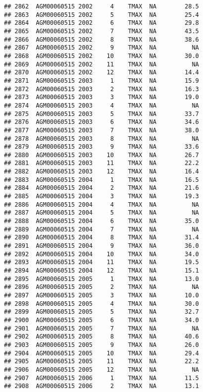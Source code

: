 \documentclass{article}\usepackage[]{graphicx}\usepackage[]{color}
\makeatletter
\newenvironment{kframe}{%
 \def\at@end@of@kframe{}%
 \ifinner\ifhmode%
  \def\at@end@of@kframe{\end{minipage}}%
  \begin{minipage}{\columnwidth}%
 \fi\fi%
 \def\FrameCommand##1{\hskip\@totalleftmargin \hskip-\fboxsep
 \colorbox{shadecolor}{##1}\hskip-\fboxsep
     \hskip-\linewidth \hskip-\@totalleftmargin \hskip\columnwidth}%
 \MakeFramed {\advance\hsize-\width
   \@totalleftmargin\z@ \linewidth\hsize
   \@setminipage}}%
 {\par\unskip\endMakeFramed%
 \at@end@of@kframe}
\newenvironment{knitrout}{}{} %
\makeatother
\begin{document}
\begin{knitrout}
\begin{kframe}
\begin{verbatim}
## 2862  AGM00060515 2002     4    TMAX  NA        28.5
## 2863  AGM00060515 2002     5    TMAX  NA        25.4
## 2864  AGM00060515 2002     6    TMAX  NA        29.8
## 2865  AGM00060515 2002     7    TMAX  NA        43.5
## 2866  AGM00060515 2002     8    TMAX  NA        38.6
## 2867  AGM00060515 2002     9    TMAX  NA          NA
## 2868  AGM00060515 2002    10    TMAX  NA        30.0
## 2869  AGM00060515 2002    11    TMAX  NA          NA
## 2870  AGM00060515 2002    12    TMAX  NA        14.4
## 2871  AGM00060515 2003     1    TMAX  NA        15.9
## 2872  AGM00060515 2003     2    TMAX  NA        16.3
## 2873  AGM00060515 2003     3    TMAX  NA        19.0
## 2874  AGM00060515 2003     4    TMAX  NA          NA
## 2875  AGM00060515 2003     5    TMAX  NA        33.7
## 2876  AGM00060515 2003     6    TMAX  NA        34.6
## 2877  AGM00060515 2003     7    TMAX  NA        38.0
## 2878  AGM00060515 2003     8    TMAX  NA          NA
## 2879  AGM00060515 2003     9    TMAX  NA        33.6
## 2880  AGM00060515 2003    10    TMAX  NA        26.7
## 2881  AGM00060515 2003    11    TMAX  NA        22.2
## 2882  AGM00060515 2003    12    TMAX  NA        16.4
## 2883  AGM00060515 2004     1    TMAX  NA        16.5
## 2884  AGM00060515 2004     2    TMAX  NA        21.6
## 2885  AGM00060515 2004     3    TMAX  NA        19.3
## 2886  AGM00060515 2004     4    TMAX  NA          NA
## 2887  AGM00060515 2004     5    TMAX  NA          NA
## 2888  AGM00060515 2004     6    TMAX  NA        35.0
## 2889  AGM00060515 2004     7    TMAX  NA          NA
## 2890  AGM00060515 2004     8    TMAX  NA        31.4
## 2891  AGM00060515 2004     9    TMAX  NA        36.0
## 2892  AGM00060515 2004    10    TMAX  NA        34.0
## 2893  AGM00060515 2004    11    TMAX  NA        19.5
## 2894  AGM00060515 2004    12    TMAX  NA        15.1
## 2895  AGM00060515 2005     1    TMAX  NA        13.0
## 2896  AGM00060515 2005     2    TMAX  NA          NA
## 2897  AGM00060515 2005     3    TMAX  NA        10.0
## 2898  AGM00060515 2005     4    TMAX  NA        30.0
## 2899  AGM00060515 2005     5    TMAX  NA        32.7
## 2900  AGM00060515 2005     6    TMAX  NA        34.0
## 2901  AGM00060515 2005     7    TMAX  NA          NA
## 2902  AGM00060515 2005     8    TMAX  NA        40.6
## 2903  AGM00060515 2005     9    TMAX  NA        26.0
## 2904  AGM00060515 2005    10    TMAX  NA        29.4
## 2905  AGM00060515 2005    11    TMAX  NA        22.2
## 2906  AGM00060515 2005    12    TMAX  NA          NA
## 2907  AGM00060515 2006     1    TMAX  NA        11.5
## 2908  AGM00060515 2006     2    TMAX  NA        13.1

\end{verbatim}
\end{kframe}
\end{knitrout}
\end{document}
